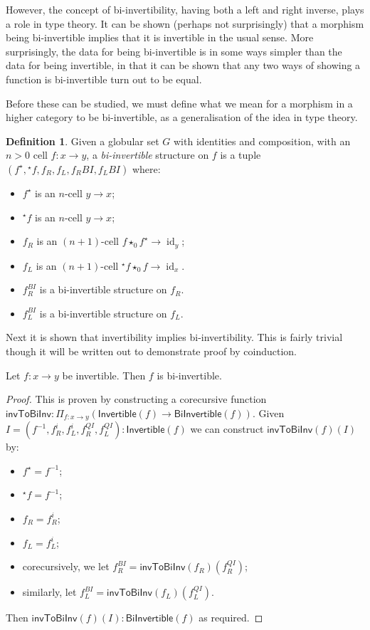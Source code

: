 \documentclass[draft]{article}
\theoremstyle{definition} \newtheorem{definition}{Definition}
\theoremstyle{remark} \newtheorem{remark}{Remark}
\DeclareMathOperator{\id}{id}
\newcommand{\linv}[1]{{}^\star\!#1} \newcommand{\rinv}[1]{#1^\star}
\newcommand{\inv}[1]{#1^{-1}} \newcommand{\comp}{\star}
\begin{document}
However, the concept of bi-invertibility, having both a left and right
inverse, plays a role in type theory. It can be shown (perhaps not
surprisingly) that a morphism being bi-invertible implies that it is
invertible in the usual sense. More surprisingly, the data for being
bi-invertible is in some ways simpler than the data for being
invertible, in that it can be shown that any two ways of showing a
function is bi-invertible turn out to be equal.

Before these can be studied, we must define what we mean for a
morphism in a higher category to be bi-invertible, as a generalisation
of the idea in type theory.

\begin{definition}
  Given a globular set \(G\) with identities and composition, with an
  \(n > 0\) cell \(f : x \to y\), a \emph{bi-invertible} structure on
  \(f\) is a tuple \((\rinv f, \linv f, f_R, f_L, f_R{}BI, f_L{}BI)\)
  where:
  \begin{itemize}
  \item \(\rinv f\) is an \(n\)-cell \(y \to x\);
  \item \(\linv f\) is an \(n\)-cell \(y \to x\);
  \item \(f_R\) is an \((n+1)\)-cell \(f \comp_0 \rinv f \to \id_y\);
  \item \(f_L\) is an \((n+1)\)-cell \(\linv f \comp_0 f \to \id_x\).
  \item \(f_R^{BI}\) is a bi-invertible structure on \(f_R\).
  \item \(f_L^{BI}\) is a bi-invertible structure on \(f_L\).
  \end{itemize}
\end{definition}

Next it is shown that invertibility implies bi-invertibility. This is
fairly trivial though it will be written out to demonstrate proof by
coinduction.

\begin{lemma}\label{inv-to-bi-inv}
  Let \(f : x \to y\) be invertible. Then \(f\) is bi-invertible.
\end{lemma}

\begin{proof}
  This is proven by constructing a corecursive function
  \(\mathsf{invToBiInv} : \Pi_{f : x \to y} (\mathsf{Invertible}(f)
  \to \mathsf{BiInvertible}(f))\). Given \(I = (\inv
  f,f_R^i,f_L^i,f_R^{QI}, f_L^{QI}) : \mathsf{Invertible}(f)\) we can
  construct \(\mathsf{invToBiInv}(f)(I)\) by:
  \begin{itemize}
  \item \(\rinv f = \inv f\);
  \item \(\linv f = \inv f\);
  \item \(f_R = f_R^i\);
  \item \(f_L = f_L^i\);
  \item corecursively, we let \(f_R^{BI} =
    \mathsf{invToBiInv}(f_R)(f_R^{QI})\);
  \item similarly, let \(f_L^{BI} =
    \mathsf{invToBiInv}(f_L)(f_L^{QI})\).
  \end{itemize}
  Then \(\mathsf{invToBiInv}(f)(I) : \mathsf{BiInvertible}(f)\) as
  required.
\end{proof}
\end{document}
